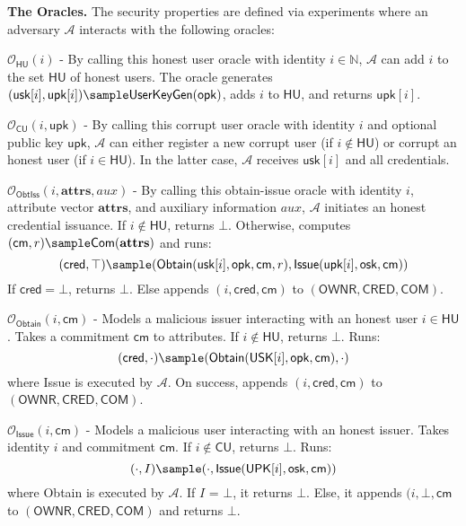 \noindent  \textbf{The Oracles.} The security properties are defined via experiments where an adversary $\mathcal{A}$ interacts with the following oracles:

\noindent $\mathcal{O}_{\mathsf{HU}}(i)$ - By calling this honest user oracle with identity $i \in \mathbb{N}$, $\mathcal{A}$ can add $i$ to the set $\mathsf{HU}$ of honest users. The oracle generates $(\mathsf{usk}[i], \mathsf{upk}[i]) \sample \mathsf{UserKeyGen}(\mathsf{opk})$, adds $i$ to $\mathsf{HU}$, and returns $\mathsf{upk}[i]$.

\noindent $\mathcal{O}_{\mathsf{CU}}(i, \mathsf{upk})$ - By calling this corrupt user oracle with identity $i$ and optional public key $\mathsf{upk}$, $\mathcal{A}$ can either register a new corrupt user (if $i \notin \mathsf{HU}$) or corrupt an honest user (if $i \in \mathsf{HU}$). In the latter case, $\mathcal{A}$ receives $\mathsf{usk}[i]$ and all credentials.

\noindent $\mathcal{O}_{\mathsf{ObtIss}}(i, \mathbf{attrs}, aux)$ - By calling this obtain-issue oracle with identity $i$, attribute vector $\mathbf{attrs}$, and auxiliary information $aux$, $\mathcal{A}$ initiates an honest credential issuance. If $i \notin \mathsf{HU}$, returns $\bot$. Otherwise, computes $(\mathsf{cm}, r) \sample \mathsf{Com}(\mathbf{attrs})$ and runs:
\[
(\mathsf{cred}, \top) \sample (\mathsf{Obtain}(\mathsf{usk}[i], \mathsf{opk}, \mathsf{cm}, r), \mathsf{Issue}(\mathsf{upk}[i], \mathsf{osk}, \mathsf{cm}))
\]
If $\mathsf{cred} = \bot$, returns $\bot$. Else appends $(i, \mathsf{cred}, \mathsf{cm})$ to $(\mathsf{OWNR}, \mathsf{CRED}, \mathsf{COM})$.

\noindent  $\mathcal{O}_{\mathsf{Obtain}}(i, \mathsf{cm})$ - Models a malicious issuer interacting with an honest user $i \in \mathsf{HU}$. Takes a commitment $\mathsf{cm}$ to attributes. If $i \notin \mathsf{HU}$, returns $\bot$. Runs:
\[
(\mathsf{cred}, \cdot) \sample (\mathsf{Obtain}(\mathsf{USK}[i], \mathsf{opk}, \mathsf{cm}), \cdot)
\]
where Issue is executed by $\mathcal{A}$. On success, appends $(i, \mathsf{cred}, \mathsf{cm})$ to $(\mathsf{OWNR}, \mathsf{CRED}, \mathsf{COM})$.

\noindent  $\mathcal{O}_{\mathsf{Issue}}(i, \mathsf{cm})$ - Models a malicious user interacting with an honest issuer. Takes identity $i$ and commitment $\mathsf{cm}$. If $i \notin \mathsf{CU}$, returns $\bot$. Runs:
\[
(\cdot, I) \sample (\cdot, \mathsf{Issue}(\mathsf{UPK}[i], \mathsf{osk}, \mathsf{cm}))
\]
where Obtain is executed by $\mathcal{A}$. If $I$ = $\bot$, it returns $\bot$. Else, it appends $(i, \bot, \mathsf{cm}$ to $(\mathsf{OWNR}, \mathsf{CRED}, \mathsf{COM})$ and returns $\bot$.

